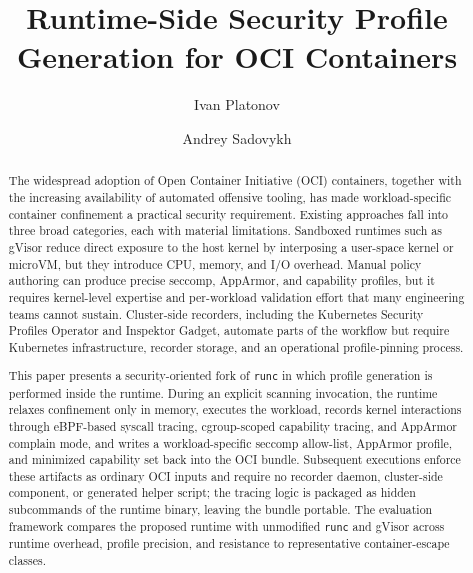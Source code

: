 \documentclass[runningheads]{llncs}
\begin{document}
\title{Runtime-Side Security Profile Generation for OCI Containers}

\author{Ivan Platonov \and Andrey Sadovykh}

\maketitle

\begin{abstract}

The widespread adoption of Open Container Initiative (OCI) containers, together with the increasing availability of automated offensive tooling, has made workload-specific container confinement a practical security requirement. Existing approaches fall into three broad categories, each with material limitations. Sandboxed runtimes such as gVisor reduce direct exposure to the host kernel by interposing a user-space kernel or microVM, but they introduce CPU, memory, and I/O overhead. Manual policy authoring can produce precise seccomp, AppArmor, and capability profiles, but it requires kernel-level expertise and per-workload validation effort that many engineering teams cannot sustain. Cluster-side recorders, including the Kubernetes Security Profiles Operator and Inspektor Gadget, automate parts of the workflow but require Kubernetes infrastructure, recorder storage, and an operational profile-pinning process.

This paper presents a security-oriented fork of \texttt{runc} in which profile generation is performed inside the runtime. During an explicit scanning invocation, the runtime relaxes confinement only in memory, executes the workload, records kernel interactions through eBPF-based syscall tracing, cgroup-scoped capability tracing, and AppArmor complain mode, and writes a workload-specific seccomp allow-list, AppArmor profile, and minimized capability set back into the OCI bundle. Subsequent executions enforce these artifacts as ordinary OCI inputs and require no recorder daemon, cluster-side component, or generated helper script; the tracing logic is packaged as hidden subcommands of the runtime binary, leaving the bundle portable. The evaluation framework compares the proposed runtime with unmodified \texttt{runc} and gVisor across runtime overhead, profile precision, and resistance to representative container-escape classes.

\end{abstract}
\end{document}

